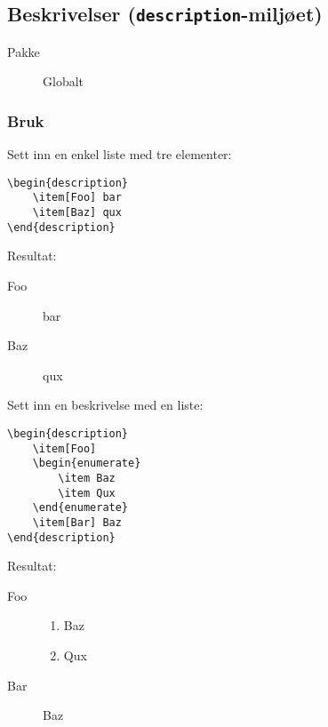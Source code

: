 \subsection{Beskrivelser (\texttt{description}-miljøet)}
\label{env:description}
\begin{description}
    \item[Pakke] Globalt
\end{description}

\subsubsection*{Bruk}
Sett inn en enkel liste med tre elementer:
\vspace{0.75em}
\begin{lstlisting}[language=Tex]
\begin{description}
    \item[Foo] bar
    \item[Baz] qux
\end{description}
\end{lstlisting}

\noindent Resultat:
\begin{description}
    \item[Foo] bar
    \item[Baz] qux
\end{description}
\vspace{0.75em}


\horizontalrule


\noindent Sett inn en beskrivelse med en liste:
\vspace{0.75em}
\begin{lstlisting}[language=Tex]
\begin{description}
    \item[Foo]
    \begin{enumerate}
        \item Baz
        \item Qux
    \end{enumerate}
    \item[Bar] Baz
\end{description}
\end{lstlisting}
\vspace{0.75em}

\noindent Resultat:
\begin{description}
    \item[Foo]
    \begin{enumerate}
        \item Baz
        \item Qux
    \end{enumerate}
    \item[Bar] Baz
\end{description}
